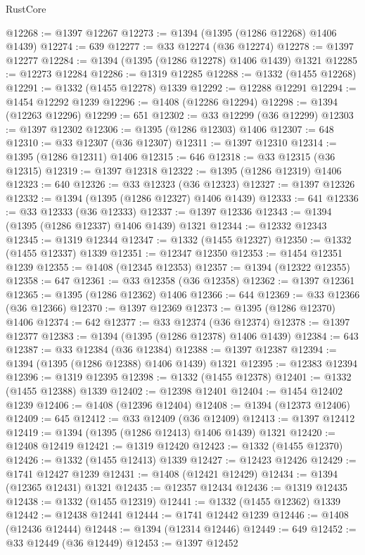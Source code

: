 \begin{lexlean}{RustCore}
\begin{coremodule}
@12268 := @1397 @12267
@12273 := @1394 (@1395 (@1286 @12268) @1406 @1439)
@12274 := 639
@12277 := @33 @12274 (@36 @12274)
@12278 := @1397 @12277
@12284 := @1394 (@1395 (@1286 @12278) @1406 @1439) @1321
@12285 := @12273 @12284
@12286 := @1319 @12285
@12288 := @1332 (@1455 @12268)
@12291 := @1332 (@1455 @12278) @1339
@12292 := @12288 @12291
@12294 := @1454 @12292 @1239
@12296 := @1408 (@12286 @12294)
@12298 := @1394 (@12263 @12296)
@12299 := 651
@12302 := @33 @12299 (@36 @12299)
@12303 := @1397 @12302
@12306 := @1395 (@1286 @12303) @1406
@12307 := 648
@12310 := @33 @12307 (@36 @12307)
@12311 := @1397 @12310
@12314 := @1395 (@1286 @12311) @1406
@12315 := 646
@12318 := @33 @12315 (@36 @12315)
@12319 := @1397 @12318
@12322 := @1395 (@1286 @12319) @1406
@12323 := 640
@12326 := @33 @12323 (@36 @12323)
@12327 := @1397 @12326
@12332 := @1394 (@1395 (@1286 @12327) @1406 @1439)
@12333 := 641
@12336 := @33 @12333 (@36 @12333)
@12337 := @1397 @12336
@12343 := @1394 (@1395 (@1286 @12337) @1406 @1439) @1321
@12344 := @12332 @12343
@12345 := @1319 @12344
@12347 := @1332 (@1455 @12327)
@12350 := @1332 (@1455 @12337) @1339
@12351 := @12347 @12350
@12353 := @1454 @12351 @1239
@12355 := @1408 (@12345 @12353)
@12357 := @1394 (@12322 @12355)
@12358 := 647
@12361 := @33 @12358 (@36 @12358)
@12362 := @1397 @12361
@12365 := @1395 (@1286 @12362) @1406
@12366 := 644
@12369 := @33 @12366 (@36 @12366)
@12370 := @1397 @12369
@12373 := @1395 (@1286 @12370) @1406
@12374 := 642
@12377 := @33 @12374 (@36 @12374)
@12378 := @1397 @12377
@12383 := @1394 (@1395 (@1286 @12378) @1406 @1439)
@12384 := 643
@12387 := @33 @12384 (@36 @12384)
@12388 := @1397 @12387
@12394 := @1394 (@1395 (@1286 @12388) @1406 @1439) @1321
@12395 := @12383 @12394
@12396 := @1319 @12395
@12398 := @1332 (@1455 @12378)
@12401 := @1332 (@1455 @12388) @1339
@12402 := @12398 @12401
@12404 := @1454 @12402 @1239
@12406 := @1408 (@12396 @12404)
@12408 := @1394 (@12373 @12406)
@12409 := 645
@12412 := @33 @12409 (@36 @12409)
@12413 := @1397 @12412
@12419 := @1394 (@1395 (@1286 @12413) @1406 @1439) @1321
@12420 := @12408 @12419
@12421 := @1319 @12420
@12423 := @1332 (@1455 @12370)
@12426 := @1332 (@1455 @12413) @1339
@12427 := @12423 @12426
@12429 := @1741 @12427 @1239
@12431 := @1408 (@12421 @12429)
@12434 := @1394 (@12365 @12431) @1321
@12435 := @12357 @12434
@12436 := @1319 @12435
@12438 := @1332 (@1455 @12319)
@12441 := @1332 (@1455 @12362) @1339
@12442 := @12438 @12441
@12444 := @1741 @12442 @1239
@12446 := @1408 (@12436 @12444)
@12448 := @1394 (@12314 @12446)
@12449 := 649
@12452 := @33 @12449 (@36 @12449)
@12453 := @1397 @12452

\end{coremodule}
\end{lexlean}
